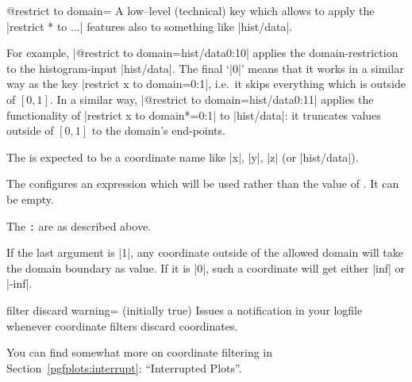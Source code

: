 \begin{pgfplotskey}{@restrict to domain=}
	A low--level (technical) key which allows to apply the |restrict * to ...| features also to something like |hist/data|.

	For example,
	|@restrict to domain={hist/data}{}{0:1}{0}| applies the domain-restriction to the histogram-input |hist/data|. The final `|0|' means that it works in a similar way as the key |restrict x to domain=0:1|, i.e.\ it skips everything which is outside of $[0,1]$.  In a similar way,
	|@restrict to domain={hist/data}{}{0:1}{1}| applies the functionality of |restrict x to domain*=0:1| to |hist/data|: it truncates values outside of $[0,1]$ to the domain's end-points.

	The  is expected to be a coordinate name like |x|, |y|, |z| (or |hist/data|).

	The  configures an expression which will be used rather than the value of . It can be empty.

	The \texttt{:} are as described above.

	If the last argument is |1|, any coordinate outside of the allowed domain will take the domain boundary as value. If it is |0|, such a coordinate will get either |inf| or |-inf|.
\end{pgfplotskey}

\begin{pgfplotskey}{filter discard warning= (initially true)}
	Issues a notification in your logfile whenever coordinate filters discard coordinates.
\end{pgfplotskey}

You can find somewhat more on coordinate filtering in Section~\ref{pgfplots:interrupt}: ``Interrupted Plots''.

